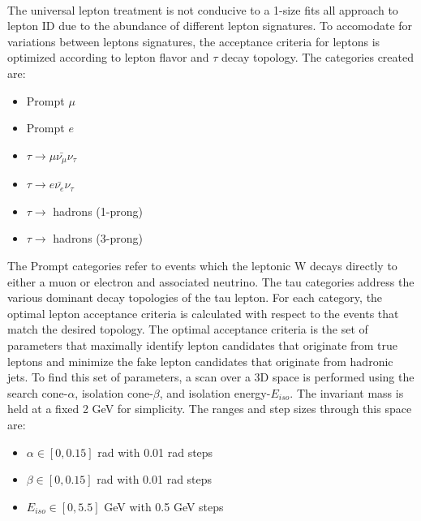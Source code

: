 \quad \quad \\
The universal lepton treatment is not conducive to a 1-size fits all approach to lepton ID due to the abundance of different lepton signatures. To accomodate for variations between leptons signatures, the acceptance criteria for leptons is optimized according to lepton flavor and $\tau$ decay topology. The categories created are:
\begin{itemize}
\item Prompt $\mu$
\item Prompt $e$
\item $\tau \rightarrow \mu \bar{\nu_{\mu}} \nu_{\tau} $
\item $\tau \rightarrow e \bar{\nu_{e}} \nu_{\tau} $
\item $\tau \rightarrow$ hadrons (1-prong)
\item $\tau \rightarrow$ hadrons (3-prong)
\end{itemize} 
The Prompt categories refer to events which the leptonic W decays directly to either a muon or electron and associated neutrino. The tau categories address the various dominant decay topologies of the tau lepton. For each category, the optimal lepton acceptance criteria is calculated with respect to the events that match the desired topology. The optimal acceptance criteria is the set of parameters that maximally identify lepton candidates that originate from true leptons and minimize the fake lepton candidates that originate from hadronic jets. To find this set of parameters, a scan over a 3D space is performed using the search cone-$\alpha$, isolation cone-$\beta$, and isolation energy-$E_{iso}$. The invariant mass is held at a fixed 2 GeV for simplicity. The ranges and step sizes through this space are:

 \begin{itemize}
 \item $\alpha \in [0,0.15]$ rad with 0.01 rad steps
 \item $\beta \in [0,0.15]$ rad with 0.01 rad steps
 \item $E_{iso} \in [0,5.5]$ GeV with 0.5 GeV steps
 \end{itemize}


